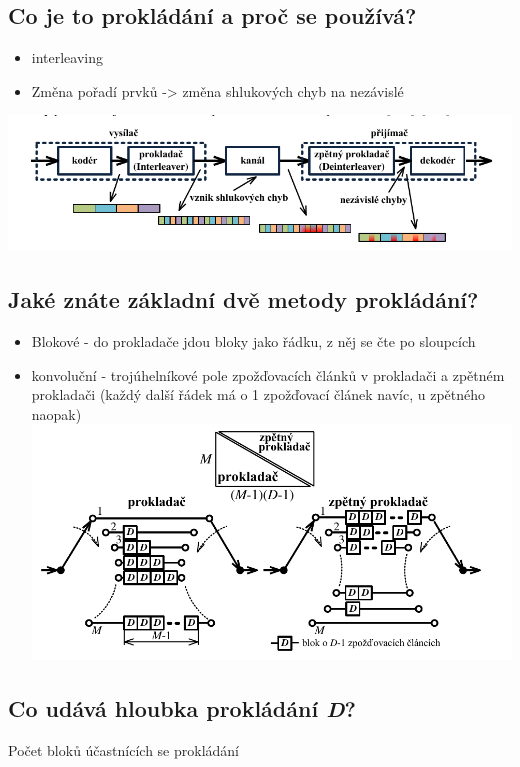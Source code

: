\subsection{Co je to prokládání a proč se používá?}
\begin{itemize}
    \item interleaving
    \item Změna pořadí prvků -> změna shlukových chyb na nezávislé
\end{itemize}
\includegraphics[width=16cm]{images/9_prokladani.png}

\subsection{Jaké znáte základní dvě metody prokládání?}
\begin{itemize}
    \item Blokové - do prokladače jdou bloky jako  řádku, z něj se čte po sloupcích
    \item konvoluční - trojúhelníkové pole zpožďovacích článků v prokladači a zpětném prokladači
    (každý další řádek má o 1 zpožďovací článek navíc, u zpětného naopak) \\
    \includegraphics[width=16cm]{images/9_konvol_prokl.png}
\end{itemize}

\subsection{Co udává hloubka prokládání \textit{D}?}
Počet bloků účastnících se prokládání

